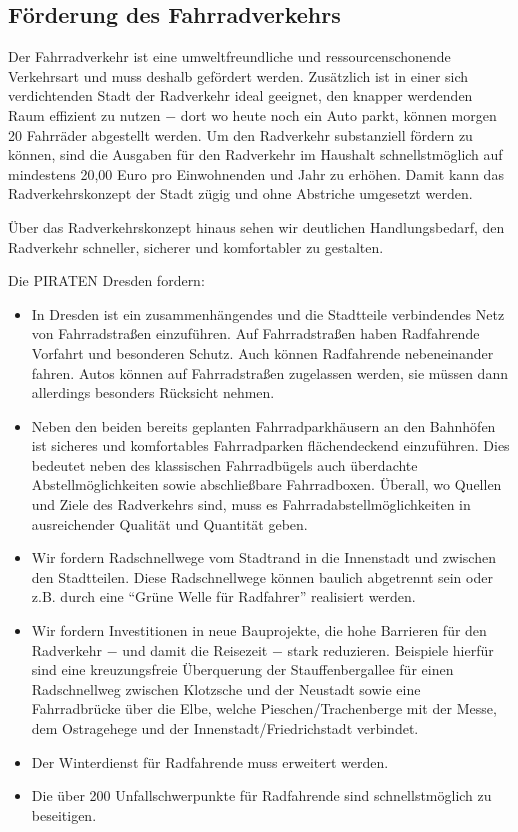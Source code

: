 \documentclass[a4paper, 11pt]{article}
\begin{document}
\subsection{Förderung des Fahrradverkehrs}
Der Fahrradverkehr ist eine umweltfreundliche und ressourcenschonende Verkehrsart und muss deshalb gefördert werden. Zusätzlich ist in einer sich verdichtenden Stadt der Radverkehr ideal geeignet, den knapper werdenden Raum effizient zu nutzen $-$ dort wo heute noch ein Auto parkt, können morgen 20 Fahrräder abgestellt werden. Um den Radverkehr substanziell fördern zu können, sind die Ausgaben für den Radverkehr im Haushalt schnellstmöglich auf mindestens 20,00 Euro pro Einwohnenden und Jahr zu erhöhen. Damit kann das Radverkehrskonzept der Stadt zügig und ohne Abstriche umgesetzt werden.\newline

Über das Radverkehrskonzept hinaus sehen wir deutlichen Handlungsbedarf, den Radverkehr schneller, sicherer und komfortabler zu gestalten.

Die PIRATEN Dresden fordern:
\begin{itemize}
    \item In Dresden ist ein zusammenhängendes und die Stadtteile verbindendes Netz von Fahrradstraßen einzuführen. Auf Fahrradstraßen haben Radfahrende Vorfahrt und besonderen Schutz. Auch können Radfahrende nebeneinander fahren. Autos können auf Fahrradstraßen zugelassen werden, sie müssen dann allerdings besonders Rücksicht nehmen.

    \item  Neben den beiden bereits geplanten Fahrradparkhäusern an den Bahnhöfen ist sicheres und komfortables Fahrradparken flächendeckend einzuführen. Dies bedeutet neben des klassischen Fahrradbügels auch überdachte Abstellmöglichkeiten sowie abschließbare Fahrradboxen. Überall, wo Quellen und Ziele des Radverkehrs sind, muss es Fahrradabstellmöglichkeiten in ausreichender Qualität und Quantität geben.

    \item  Wir fordern Radschnellwege vom Stadtrand in die Innenstadt und zwischen den Stadtteilen. Diese Radschnellwege können baulich abgetrennt sein oder z.B. durch eine ``Grüne Welle für Radfahrer'' realisiert werden.

    \item  Wir fordern Investitionen in neue Bauprojekte, die hohe Barrieren für den Radverkehr $-$ und damit die Reisezeit $-$ stark reduzieren. Beispiele hierfür sind eine kreuzungsfreie Überquerung der Stauffenbergallee für einen Radschnellweg zwischen Klotzsche und der Neustadt sowie eine Fahrradbrücke über die Elbe, welche Pieschen/Trachenberge mit der Messe, dem Ostragehege und der Innenstadt/Friedrichstadt verbindet.

    \item  Der Winterdienst für Radfahrende muss erweitert werden.

    \item Die über 200 Unfallschwerpunkte für Radfahrende sind schnellstmöglich zu beseitigen.
\end{itemize}
\end{document}

